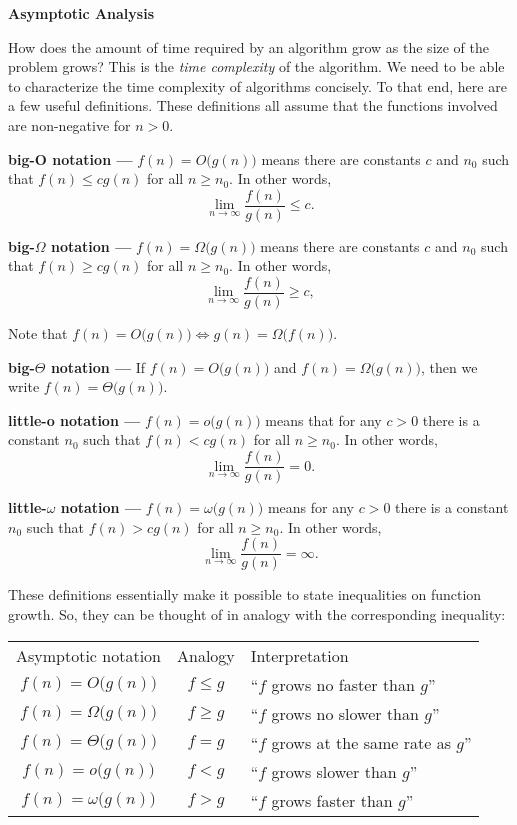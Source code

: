 \documentclass{article}
\begin{document}
{\Large\bf Asymptotic Analysis}

How does the amount of time required by an algorithm
grow as the size of the problem grows?
This is the \textit{time complexity} of the algorithm.
We need to be able to characterize the time complexity of algorithms
concisely. To that end, here are a few useful definitions.
These definitions all assume that the functions involved are non-negative for
$n>0$.

{\large\bf big-O notation ---}
$f(n)=O\big(g(n)\big)$ means there are constants
$c$ and $n_0$
such that
$f(n) \le cg(n)$
for all $n\ge n_0$.
In other words,
\[
  \lim_{n\rightarrow\infty} \frac{f(n)}{g(n)} \le c .
\]

{\large\bf big-$\Omega$ notation ---}
$f(n)=\Omega\big(g(n)\big)$ means there are constants
$c$ and $n_0$
such that
$f(n) \ge cg(n)$
for all $n\ge n_0$.
In other words,
\[
  \lim_{n\rightarrow\infty} \frac{f(n)}{g(n)} \ge c,
\]

Note that
$f(n)=O\big(g(n)\big) \Longleftrightarrow g(n)=\Omega\big(f(n)\big)$.

{\large\bf big-$\Theta$ notation ---}
If
$f(n)=O\big(g(n)\big)$
and
$f(n)=\Omega\big(g(n)\big)$,
then we write
$f(n)=\Theta\big(g(n)\big)$.

{\large\bf little-o notation ---}
$f(n)=o\big(g(n)\big)$ means that for any $c>0$ there is a constant
$n_0$
such that
$f(n) < cg(n)$
for all $n\ge n_0$.
In other words,
\[
  \lim_{n\rightarrow\infty} \frac{f(n)}{g(n)} = 0 .
\]

{\large\bf little-$\omega$ notation ---}
$f(n)=\omega\big(g(n)\big)$ means for any $c>0$ there is a constant
$n_0$
such that
$f(n) > cg(n)$
for all $n\ge n_0$.
In other words,
\[
  \lim_{n\rightarrow\infty} \frac{f(n)}{g(n)} = \infty .
\]

These definitions essentially make it possible to state
inequalities on function growth. So, they can be thought
of in analogy with the corresponding inequality:

\begin{tabular}{ccl}
 Asymptotic notation         & Analogy  & Interpretation \\
 $f(n)=O\big(g(n)\big)$      & $f\le g$ & ``$f$ grows no faster than $g$''      \\
 $f(n)=\Omega\big(g(n)\big)$ & $f\ge g$ & ``$f$ grows no slower than $g$''      \\
 $f(n)=\Theta\big(g(n)\big)$ & $f=g$    & ``$f$ grows at the same rate as $g$'' \\
 $f(n)=o\big(g(n)\big)$      & $f<g$    & ``$f$ grows slower than $g$''    \\
 $f(n)=\omega\big(g(n)\big)$ & $f>g$    & ``$f$ grows faster than $g$''   \\
\end{tabular}
\end{document}
